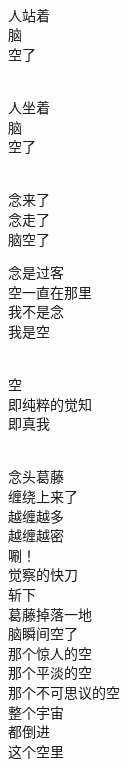 \begin{poem}[空]
    \begin{multicols}{5}
        \begin{center}~\\
            人站着 \\ 脑 \\ 空了

            ~\\

            人坐着 \\ 脑 \\ 空了

            ~\\

            念来了 \\ 念走了 \\ 脑空了

            念是过客 \\ 空一直在那里 \\ 我不是念 \\ 我是空

            ~\\

            空 \\ 即纯粹的觉知 \\ 即真我
        \end{center}
    \end{multicols}
\end{poem}

\begin{poem}[斩]
    \begin{multicols}{4}
        \begin{center}~\\
            念头葛藤 \\ 缠绕上来了 \\ 越缠越多 \\ 越缠越密 \\ 唰！ \\ 觉察的快刀 \\ 斩下 \\ 葛藤掉落一地 \\ 脑瞬间空了 \\ 那个惊人的空 \\ 那个平淡的空 \\ 那个不可思议的空 \\ 整个宇宙 \\ 都倒进 \\ 这个空里
        \end{center}
    \end{multicols}
\end{poem}

